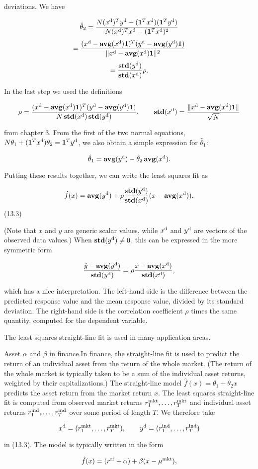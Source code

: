 deviations. We have

\[\hat{\theta}_{2} = \frac{N(x^{\rm d})^{T}y^{\rm d}-(\mathbf{1}^{T}x^{\rm d})(\mathbf{1}^ {T}y^{\rm d})}{N(x^{\rm d})^{T}x^{\rm d}-(\mathbf{1}^{T}x^{\rm d})^{2}}\] \[= \frac{(x^{\rm d}-\mathbf{avg}(x^{\rm d})\mathbf{1})^{T}(y^{\rm d}- \mathbf{avg}(y^{\rm d})\mathbf{1})}{\|x^{\rm d}-\mathbf{avg}(x^{\rm d})\mathbf{ 1}\|^{2}}\] \[= \frac{\mathbf{std}(y^{\rm d})}{\mathbf{std}(x^{\rm d})}\rho.\]

In the last step we used the definitions

\[\rho=\frac{(x^{\rm d}-\mathbf{avg}(x^{\rm d})\mathbf{1})^{T}(y^{\rm d}- \mathbf{avg}(y^{\rm d})\mathbf{1})}{N\,\mathbf{std}(x^{\rm d})\,\mathbf{std}(y ^{\rm d})},\qquad\mathbf{std}(x^{\rm d})=\frac{\|x^{\rm d}-\mathbf{avg}(x^{\rm d })\mathbf{1}\|}{\sqrt{N}}\]

from chapter 3. From the first of the two normal equations, \(N\theta_{1}+(\mathbf{1}^{T}x^{\rm d})\theta_{2}=\mathbf{1}^{T}y^{\rm d}\), we also obtain a simple expression for \(\hat{\theta}_{1}\):

\[\hat{\theta}_{1}=\mathbf{avg}(y^{\rm d})-\hat{\theta}_{2}\,\mathbf{avg}(x^{ \rm d}).\]

Putting these results together, we can write the least squares fit as

\[\hat{f}(x)=\mathbf{avg}(y^{\rm d})+\rho\frac{\mathbf{std}(y^{\rm d})}{\mathbf{ std}(x^{\rm d})}(x-\mathbf{avg}(x^{\rm d})).\] (13.3)

(Note that \(x\) and \(y\) are generic scalar values, while \(x^{\rm d}\) and \(y^{\rm d}\) are vectors of the observed data values.) When \(\mathbf{std}(y^{\rm d})\neq 0\), this can be expressed in the more symmetric form

\[\frac{\hat{y}-\mathbf{avg}(y^{\rm d})}{\mathbf{std}(y^{\rm d})}=\rho\frac{x- \mathbf{avg}(x^{\rm d})}{\mathbf{std}(x^{\rm d})},\]

which has a nice interpretation. The left-hand side is the difference between the predicted response value and the mean response value, divided by its standard deviation. The right-hand side is the correlation coefficient \(\rho\) times the same quantity, computed for the dependent variable.

The least squares straight-line fit is used in many application areas.

Asset \(\alpha\) and \(\beta\) in finance.In finance, the straight-line fit is used to predict the return of an individual asset from the return of the whole market. (The return of the whole market is typically taken to be a sum of the individual asset returns, weighted by their capitalizations.) The straight-line model \(\hat{f}(x)=\theta_{1}+\theta_{2}x\) predicts the asset return from the market return \(x\). The least squares straight-line fit is computed from observed market returns \(r_{1}^{\rm mkt},\ldots,r_{T}^{\rm mkt}\) and individual asset returns \(r_{1}^{\rm ind},\ldots,r_{T}^{\rm ind}\) over some period of length \(T\). We therefore take

\[x^{\rm d}=(r_{1}^{\rm mkt},\ldots,r_{T}^{\rm mkt}),\qquad y^{\rm d}=(r_{1}^{ \rm ind},\ldots,r_{T}^{\rm ind})\]

in (13.3). The model is typically written in the form

\[\hat{f}(x)=(r^{\rm rf}+\alpha)+\beta(x-\mu^{\rm mkt}),\] 
